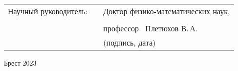 \vspace{10 pt}
 \noindent
 \begin{tabular}{lp{4em}l}
   Научный руководитель:   &&  \hspace{- 1.2 cm} Доктор физико-математических наук, \\ \\
                           &&   \hspace{- 1.2 cm} профессор \underline{\hspace{3.4cm}} ~Плетюхов В.\,А. \\
                           &&   \hspace {1.8 cm}\footnotesize{(подпись, дата)}
 \end{tabular}
 \vfill

 \begin{center}
    {\normalsize Брест 2023}
  \end{center}
